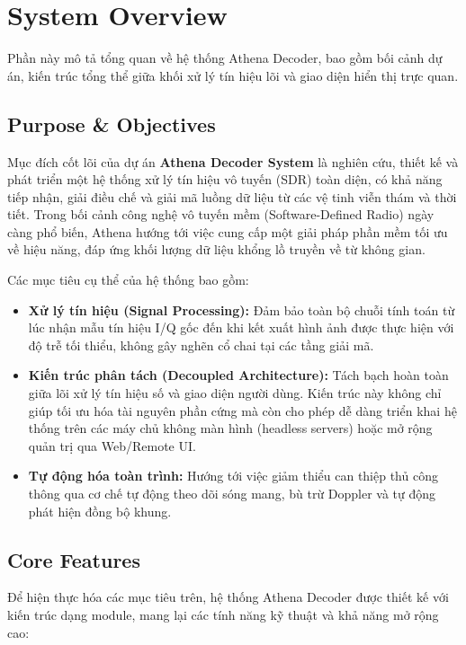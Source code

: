 \documentclass[11pt,a4paper]{article}
\begin{document}
\tableofcontents
\newpage


\section{System Overview}
Phần này mô tả tổng quan về hệ thống Athena Decoder, bao gồm bối cảnh dự án, kiến trúc tổng thể giữa khối xử lý tín hiệu lõi và giao diện hiển thị trực quan.

\subsection{Purpose \& Objectives}
Mục đích cốt lõi của dự án \textbf{Athena Decoder System} là nghiên cứu, thiết kế và phát triển một hệ thống xử lý tín hiệu vô tuyến (SDR) toàn diện, có khả năng tiếp nhận, giải điều chế và giải mã luồng dữ liệu từ các vệ tinh viễn thám và thời tiết. Trong bối cảnh công nghệ vô tuyến mềm (Software-Defined Radio) ngày càng phổ biến, Athena hướng tới việc cung cấp một giải pháp phần mềm tối ưu về hiệu năng, đáp ứng khối lượng dữ liệu khổng lồ truyền về từ không gian.

Các mục tiêu cụ thể của hệ thống bao gồm:
\begin{itemize}
    \item \textbf{Xử lý tín hiệu (Signal Processing):} Đảm bảo toàn bộ chuỗi tính toán từ lúc nhận mẫu tín hiệu I/Q gốc đến khi kết xuất hình ảnh được thực hiện với độ trễ tối thiểu, không gây nghẽn cổ chai tại các tầng giải mã.
    \item \textbf{Kiến trúc phân tách (Decoupled Architecture):} Tách bạch hoàn toàn giữa lõi xử lý tín hiệu số và giao diện người dùng. Kiến trúc này không chỉ giúp tối ưu hóa tài nguyên phần cứng mà còn cho phép dễ dàng triển khai hệ thống trên các máy chủ không màn hình (headless servers) hoặc mở rộng quản trị qua Web/Remote UI.
    \item \textbf{Tự động hóa toàn trình:} Hướng tới việc giảm thiểu can thiệp thủ công thông qua cơ chế tự động theo dõi sóng mang, bù trừ Doppler và tự động phát hiện đồng bộ khung.
\end{itemize}

\subsection{Core Features}
Để hiện thực hóa các mục tiêu trên, hệ thống Athena Decoder được thiết kế với kiến trúc dạng module, mang lại các tính năng kỹ thuật và khả năng mở rộng cao:
\end{document}
